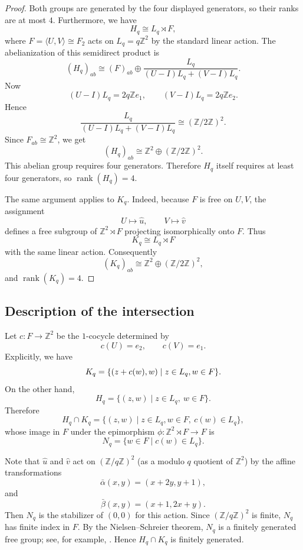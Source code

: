 \documentclass[]{amsart}
\newtheorem*{fixed point criterion}{\fixed point criterion}
\theoremstyle{definition}
\theoremstyle{remark}
\numberwithin{equation}{section}
\newcommand{\Z}{\mathbb Z}
\newcommand{\rank}{\operatorname{rank}}
\begin{document}
\begin{proof}
Both groups are generated by the four displayed generators, so their ranks are
at most $4$. Furthermore, we have
\[
H_q\cong L_q\rtimes F,
\]
where $F=\langle U,V\rangle\cong F_2$ acts on $L_q=q\Z^2$ by the standard linear
action.  The abelianization of this semidirect product is
\[
(H_q)_{ab}\cong
(F)_{ab}\oplus
\frac{L_q}{(U-I)L_q+(V-I)L_q}.
\]
Now
\[
(U-I)L_q=2q\Z e_1,
\qquad
(V-I)L_q=2q\Z e_2.
\]
Hence
\[
\frac{L_q}{(U-I)L_q+(V-I)L_q}
\cong
(\Z/2\Z)^2.
\]
Since $F_{ab}\cong \Z^2$, we get
\[
(H_q)_{ab}\cong \Z^2\oplus (\Z/2\Z)^2.
\]
This abelian group requires four generators.  Therefore $H_q$ itself requires
at least four generators, so $\rank(H_q)=4$.

The same argument applies to $K_q$.  Indeed, because $F$ is free on $U,V$, the
assignment
\[
U\mapsto \hat u,
\qquad
V\mapsto \hat v
\]
defines a free subgroup of $\Z^2\rtimes F$ projecting isomorphically onto $F$.
Thus
\[
K_q\cong L_q\rtimes F
\]
with the same linear action.  Consequently
\[
(K_q)_{ab}\cong \Z^2\oplus (\Z/2\Z)^2,
\]
and $\rank(K_q)=4$.
\end{proof}

\subsection{Description of the intersection}

Let $c:F\longrightarrow \Z^2$
be the $1$-cocycle determined by
\[
c(U)=e_2,
\qquad
c(V)=e_1.
\]
Explicitly, we have
\[
K_q=\{(z+c(w),w)\mid z\in L_q,\\ w\in F\}.
\]
On the other hand,
\[
H_q=\{(z,w)\mid z\in L_q,
\ w\in F\}.
\]
Therefore
\[
H_q\cap K_q=\{(z,w)\mid z\in L_q, w\in F,
\ c(w)\in L_q\},
\]
whose image in $F$ under the epimorphism $\phi: \Z^2\rtimes F \rightarrow F$ is 
\[
N_q=\{w\in F\mid c(w)\in L_q\}.
\]

Note that $\hat u$ and
$\hat v$ act on $(\Z/q\Z)^2$ (as a modulo $q$ quotient of $\Z^2$) by the affine transformations
\[
\bar\alpha(x,y)=(x+2y,y+1),
\]
and
\[
\bar\beta(x,y)=(x+1,2x+y).
\]
Then $N_q$ is the stabilizer of $(0,0)$ for this action.  Since
$(\Z/q\Z)^2$ is finite, $N_q$ has finite index in $F$.  By the
Nielsen--Schreier theorem, $N_q$ is a finitely generated free group; see, for
example, \cite[Ch.~I, Sec.~3]{LyndonSchupp1977}.  Hence $H_q\cap K_q$ is
finitely generated.
\end{document}
